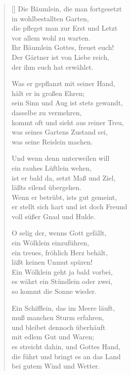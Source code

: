 \begin{multicols}{2}
\begin{verse}[\versewidth]
 Die Bäumlein, die man fortgesetzt\\
in wohlbestallten Garten,\\
die pfleget man zur Erst und Letzt\\
vor allem wohl zu warten.\\
Ihr Bäumlein Gottes, freuet euch!\\
Der Gärtner ist von Liebe reich,\\
der ihm euch hat erwählet.

 Was er gepflanzt mit seiner Hand,\\
hält er in großen Ehren;\\
sein Sinn und Aug ist stets gewandt,\\
dasselbe zu vermehren,\\
kommt oft und sieht aus reiner Treu,\\
was seines Gartens Zustand sei,\\
was seine Reislein machen.

 Und wenn denn unterweilen will\\
ein rauhes Lüftlein wehen,\\
ist er bald da, setzt Maß und Ziel,\\
läßts eilend übergehen.\\
Wenn er betrübt, ists gut gemeint,\\
er stellt sich hart und ist doch Freund\\
voll süßer Gnad und Hulde.

 O selig der, wenns Gott gefällt,\\
ein Wölklein einzuführen,\\
ein treues, fröhlich Herz behält,\\
läßt keinen Unmut spüren!\\
Ein Wölklein geht ja bald vorbei,\\
es währt ein Stündlein oder zwei,\\
so kommt die Sonne wieder.

 Ein Schifflein, das im Meere läuft,\\
muß manchen Sturm erfahren,\\
und bleibet dennoch überhäuft\\
mit edlem Gut und Waren;\\
es streicht dahin, und Gottes Hand,\\
die führt und bringt es an das Land\\
bei gutem Wind und Wetter.


\end{verse}
\end{multicols}
